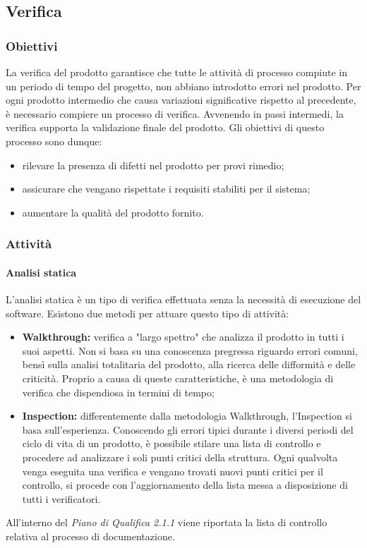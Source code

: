 \subsection{Verifica}
\subsubsection{Obiettivi}
La verifica del prodotto garantisce che tutte le attività di processo compiute in un periodo di tempo del progetto, non abbiano introdotto errori nel prodotto. Per ogni prodotto intermedio che causa variazioni significative rispetto al precedente, è necessario compiere un processo di verifica. Avvenendo in passi intermedi, la verifica supporta la validazione finale del prodotto. Gli obiettivi di questo processo sono dunque:
\begin{itemize}
	\item rilevare la presenza di difetti nel prodotto per provi rimedio;
	\item assicurare che vengano rispettate i requisiti stabiliti per il sistema;
	\item aumentare la qualità del prodotto fornito.
\end{itemize}

\subsubsection{Attività}
\paragraph{Analisi statica}
\noindent L'analisi statica è un tipo di verifica effettuata senza la necessità di esecuzione del software. Esistono due metodi per attuare questo tipo di attività:
\begin{itemize}
	\item \textbf{Walkthrough:} verifica a "largo spettro" che analizza il prodotto in tutti i suoi aspetti. Non si basa su una conoscenza pregressa riguardo errori comuni, bensì sulla analisi totalitaria del prodotto, alla ricerca delle difformità e delle criticità. Proprio a causa di queste caratteristiche, è una metodologia di verifica che dispendiosa in termini di tempo;
	\item \textbf{Inspection:} differentemente dalla metodologia Walkthrough, l'Inspection si basa sull'esperienza. Conoscendo gli errori tipici durante i diversi periodi del ciclo di vita di un prodotto, è possibile stilare una lista di controllo e procedere ad analizzare i soli punti critici della struttura. Ogni qualvolta venga eseguita una verifica e vengano trovati nuovi punti critici per il controllo, si procede con l'aggiornamento della lista messa a disposizione di tutti i verificatori.
\end{itemize}
All'interno del \textit{Piano di Qualifica 2.1.1\doc} viene riportata la lista di controllo relativa al processo di documentazione.


